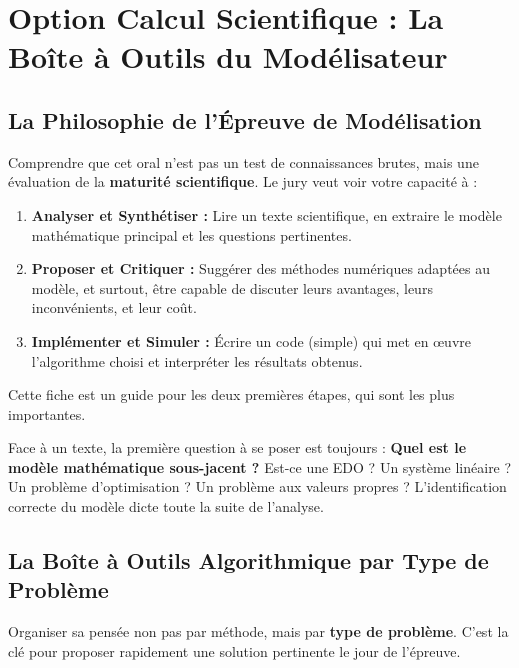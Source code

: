 \chapter{Option Calcul Scientifique : La Boîte à Outils du Modélisateur}

\section{La Philosophie de l'Épreuve de Modélisation}

\begin{objectif}
    Comprendre que cet oral n'est pas un test de connaissances brutes, mais une évaluation de la \textbf{maturité scientifique}. Le jury veut voir votre capacité à :
    \begin{enumerate}
        \item \textbf{Analyser et Synthétiser :} Lire un texte scientifique, en extraire le modèle mathématique principal et les questions pertinentes.
        \item \textbf{Proposer et Critiquer :} Suggérer des méthodes numériques adaptées au modèle, et surtout, être capable de discuter leurs avantages, leurs inconvénients, et leur coût.
        \item \textbf{Implémenter et Simuler :} Écrire un code (simple) qui met en œuvre l'algorithme choisi et interpréter les résultats obtenus.
    \end{enumerate}
    Cette fiche est un guide pour les deux premières étapes, qui sont les plus importantes.
\end{objectif}

\begin{remark}
    Face à un texte, la première question à se poser est toujours : \textbf{Quel est le modèle mathématique sous-jacent ?} Est-ce une EDO ? Un système linéaire ? Un problème d'optimisation ? Un problème aux valeurs propres ? L'identification correcte du modèle dicte toute la suite de l'analyse.
\end{remark}

\section{La Boîte à Outils Algorithmique par Type de Problème}

\begin{objectif}
    Organiser sa pensée non pas par méthode, mais par \textbf{type de problème}. C'est la clé pour proposer rapidement une solution pertinente le jour de l'épreuve.
\end{objectif}

